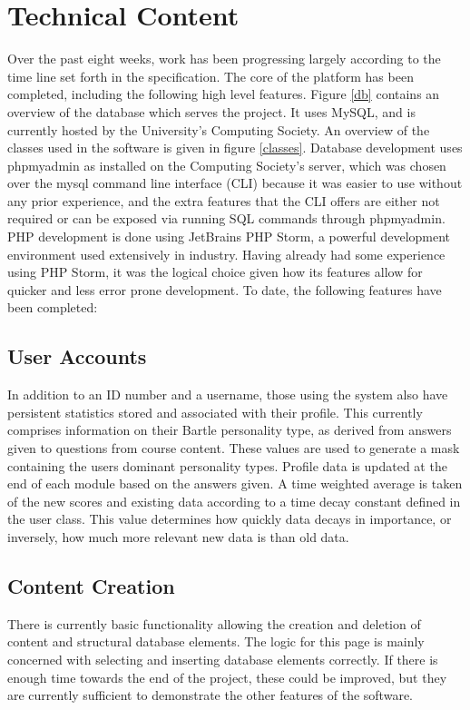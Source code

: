 \documentclass[10pt,a4paper]{report}
\begin{document}
\section*{Technical Content}
Over the past eight weeks, work has been progressing largely according to the time line set forth in the specification. The core of the platform has been completed, including the following high level features. Figure \ref{db} contains an overview of the database which serves the project. It uses MySQL, and is currently hosted by the University's Computing Society. An overview of the classes used in the software is given in figure \ref{classes}. Database development uses phpmyadmin as installed on the Computing Society's server, which was chosen over the mysql command line interface (CLI) because it was easier to use without any prior experience, and the extra features that the CLI offers are either not required or can be exposed via running SQL commands through phpmyadmin. PHP development is done using JetBrains PHP Storm, a powerful development environment used extensively in industry. Having already had some experience using PHP Storm, it was the logical choice given how its features allow for quicker and less error prone development. To date, the following features have been completed:

\subsection*{User Accounts}
In addition to an ID number and a username, those using the system also have persistent statistics stored and associated with their profile. This currently comprises information on their Bartle personality type, as derived from answers given to questions from course content. These values are used to generate a mask containing the users dominant personality types. Profile data is updated at the end of each module based on the answers given. A time weighted average is taken of the new scores and existing data according to a time decay constant defined in the user class. This value determines how quickly data decays in importance, or inversely, how much more relevant new data is than old data.

\subsection*{Content Creation}
There is currently basic functionality allowing the creation and deletion of content and structural database elements. The logic for this page is mainly concerned with selecting and inserting database elements correctly. If there is enough time towards the end of the project, these could be improved, but they are currently sufficient to demonstrate the other features of the software.
\end{document}
